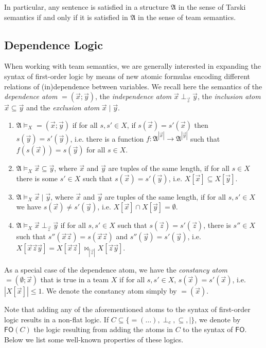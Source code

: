 \documentclass[a4paper]{amsart}
\theoremstyle{definition}
\theoremstyle{remark}
\newcommand{\A}{\mathcal{A}}
\DeclareMathOperator{\dep}{\mathop{=}}
\newcommand{\vx}{\vec{x}}
\newcommand{\vy}{\vec{y}}
\newcommand{\vz}{\vec{z}}
\newcommand\fol{\mathsf{FO}}
\theoremstyle{definition}
\renewcommand{\A}{\mathfrak{A}}
\begin{document}
\noindent In particular, any sentence is satisfied in a structure $\A$ in the sense of Tarski semantics if and only if it is satisfied in $\A$ in the sense of team semantics.


\subsection{Dependence Logic} 

When working with team semantics, we are generally interested in expanding the syntax of first-order logic by means of new atomic formulas encoding different relations of (in)dependence between variables. We recall here the semantics of the \emph{dependence atom} $\dep(\vx; \vy)$, the \emph{independence atom} $\vx\perp_{\vz}\vy$, the \emph{inclusion atom} $\vx\subseteq\vy$ and the \emph{exclusion atom} $\vx\mid\vy$.

\begin{enumerate}[resume]
    \item $\A\models_X \dep(\vx; \vy)$ if for all $s,s'\in X$, if $s(\vx)=s'(\vx)$  then $s(\vy)=s'(\vy)$, i.e. there is a function $f\colon\A^{|\vx|}\to\A^{|\vy|}$ such that $f(s(\vx)) = s(\vy)$ for all $s\in X$.
    \item $\A\models_X \vx\subseteq\vy$, where $\vx$ and $\vy$ are tuples of the same length, if for all $s\in X$ there is some $s'\in X$ such that $s(\vx)=s'(\vy)$, i.e. $X[\vx]\subseteq X[\vy]$.
    \item $\A\models_X \vx\mid\vy$, where $\vx$ and $\vy$ are tuples of the same length, if for all $s,s'\in X$ we have $s(\vx)\neq s'(\vy)$, i.e. $X[\vx]\cap X[\vy] = \emptyset$.
    \item $\A\models_X \vx\perp_{\vz}\vy$ if for all $s,s'\in X$ such that $ s(\vz)=s'(\vz)$, there is $s''\in X$ such that $s''(\vx\vz) = s(\vx\vz)$ and $s''(\vy)=s'(\vy)$, i.e. $X[\vx\vz\vy] = X[\vx\vz]\bowtie_{|\vz|}X[\vz\vy]$.
\end{enumerate}
As a special case of the dependence atom, we have the \emph{constancy atom} $\dep(\emptyset;\vx)$ that is true in a team $X$ if for all $s,s'\in X$, $s(\vx) = s'(\vx)$, i.e. $|X[\vx]|\leq 1$. We denote the constancy atom simply by $\dep(\vx)$.


Note that adding any of the aforementioned atoms to the syntax of first-order logic results in a non-flat logic. If $C\subseteq\{\dep(\dots), \perp_c, \subseteq, \mid \}$, we denote by $\fol(C)$ the logic resulting from adding the atoms in $C$ to the syntax of $\fol$. Below we list some well-known properties of these logics.
\end{document}
